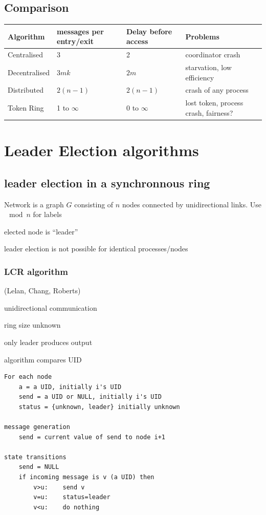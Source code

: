 \documentclass[ngerman,a4paper]{report}
\begin{document}
\section{Comparison}
\begin{tabular} {l|l|l|l}
Algorithm&messages per entry/exit&Delay before access&Problems\\
\hline
Centralised& 3& 2&coordinator crash\\
Decentralised&$3mk$&$2m$&starvation, low efficiency\\
Distributed&$2(n-1)$&$2(n-1)$&crash of any process\\
Token Ring& 1 to $\infty$&$0$ to $\infty$&lost token, process crash, fairness?
\end{tabular}

\chapter{Leader Election algorithms}
\section{leader election in a synchronnous ring}
Network is a graph $G$ consisting of $n$ nodes connected by unidirectional links. Use $\mod n$ for labels\\
\begin{compactitem}
\item elected node is ``leader''
\item leader election is not possible for identical processes/nodes
\end{compactitem}

\subsection{LCR algorithm}
(Lelan, Chang, Roberts)\\

\begin{compactitem}
\item unidirectional communication
\item ring size unknown
\item only leader produces output
\item algorithm compares UID
\end{compactitem}

\begin{lstlisting}
For each node
	a = a UID, initially i's UID
	send = a UID or NULL, initially i's UID
	status = {unknown, leader} initially unknown

message generation
	send = current value of send to node i+1

state transitions
	send = NULL
	if incoming message is v (a UID) then
		v>u: 	send v
		v=u: 	status=leader
		v<u: 	do nothing
\end{lstlisting}
\end{document}
